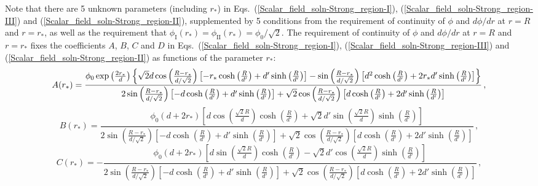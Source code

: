 \documentclass[aps,prd,onecolumn,nofootinbib]{revtex4-2} %
\begin{document}
Note that there are 5 unknown parameters (including $r_*$) in Eqs.~(\ref{Scalar_field_soln-Strong_region-I}), (\ref{Scalar_field_soln-Strong_region-III}) and (\ref{Scalar_field_soln-Strong_region-II}), supplemented by 5 conditions from the requirement of continuity of $\phi$ and $d \phi / d r$ at $r = R$ and $r = r_*$, as well as the requirement that $\phi_\textrm{I} (r_*) = \phi_\textrm{II} (r_*) = \phi_0 / \sqrt{2}$. 
The requirement of continuity of $\phi$ and $d \phi / d r$ at $r = R$ and $r = r_*$ fixes the coefficients $A$, $B$, $C$ and $D$ in Eqs.~(\ref{Scalar_field_soln-Strong_region-I}), (\ref{Scalar_field_soln-Strong_region-III}) and (\ref{Scalar_field_soln-Strong_region-II}) as functions of the parameter $r_*$: 
\begin{equation}
\normalsize
\label{coeffn-A_Strong}
A (r_*) = 
\frac{ \phi_0 \exp \left( \frac{2 r_*}{d} \right) \left\{ \sqrt{2} d \cos \left( \frac{R - r_*}{d / \sqrt{2}} \right) \left[ -r_* \cosh \left( \frac{R}{d'} \right) + d' \sinh \left( \frac{R}{d'} \right) \right] - \sin \left( \frac{R - r_*}{d / \sqrt{2}} \right) \left[ d^2 \cosh \left( \frac{R}{d'} \right) + 2 r_* d' \sinh \left( \frac{R}{d'} \right) \right] \right\} }
{ 2 \sin \left( \frac{R - r_*}{d / \sqrt{2}} \right) \left[ -d \cosh \left( \frac{R}{d'} \right) + d' \sinh \left( \frac{R}{d'} \right) \right] + \sqrt{2} \cos \left( \frac{R - r_*}{d / \sqrt{2}} \right) \left[ d \cosh \left( \frac{R}{d'} \right) + 2d' \sinh \left( \frac{R}{d'} \right) \right] }  \, , 
\end{equation}
\begin{equation}
\label{coeffn-B_Strong}
B (r_*) = 
\frac{ \phi_0 \left( d + 2 r_* \right) \left[ d \cos \left( \frac{\sqrt{2} R}{d} \right) \cosh \left( \frac{R}{d'} \right) + \sqrt{2} d' \sin \left( \frac{\sqrt{2} R}{d} \right) \sinh \left( \frac{R}{d'} \right) \right] }
{ 2 \sin \left( \frac{R - r_*}{d / \sqrt{2}} \right) \left[ -d \cosh \left( \frac{R}{d'} \right) + d' \sinh \left( \frac{R}{d'} \right) \right] + \sqrt{2} \cos \left( \frac{R - r_*}{d / \sqrt{2}} \right) \left[ d \cosh \left( \frac{R}{d'} \right) + 2d' \sinh \left( \frac{R}{d'} \right) \right] }  \, , 
\end{equation}
\begin{equation}
\label{coeffn-C_Strong}
C (r_*) = - 
\frac{ \phi_0 \left( d + 2 r_* \right) \left[ d \sin \left( \frac{\sqrt{2} R}{d} \right) \cosh \left( \frac{R}{d'} \right) - \sqrt{2} d' \cos \left( \frac{\sqrt{2} R}{d} \right) \sinh \left( \frac{R}{d'} \right) \right] }
{ 2 \sin \left( \frac{R - r_*}{d / \sqrt{2}} \right) \left[ -d \cosh \left( \frac{R}{d'} \right) + d' \sinh \left( \frac{R}{d'} \right) \right] + \sqrt{2} \cos \left( \frac{R - r_*}{d / \sqrt{2}} \right) \left[ d \cosh \left( \frac{R}{d'} \right) + 2d' \sinh \left( \frac{R}{d'} \right) \right] }  \, , 
\end{equation}
\end{document}
